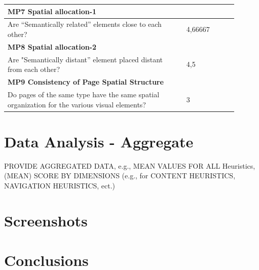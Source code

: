 \begin{longtable}{|p{0.7\linewidth}|p{0.2\linewidth}|}
\multicolumn{2}{|l|}{\textbf{MP7 Spatial allocation-1}} \\
\hline
Are “Semantically related” elements close to each other? & 4,66667  \\
\hline

\multicolumn{2}{|l|}{\textbf{MP8 Spatial allocation-2}} \\
\hline
Are "Semantically distant” element placed distant from each other? & 4,5  \\
\hline

\multicolumn{2}{|l|}{\textbf{MP9 Consistency of Page Spatial Structure}} \\
\hline
Do pages of the same type have the same spatial organization for the various visual elements? & 3  \\
\hline

\end{longtable}

\section{Data Analysis - Aggregate}
PROVIDE AGGREGATED DATA, e.g., MEAN VALUES FOR ALL Heuristics,
(MEAN) SCORE BY DIMENSIONS (e.g., for CONTENT HEURISTICS,
NAVIGATION HEURISTICS, ect.)

\section{Screenshots}

\section{Conclusions}
